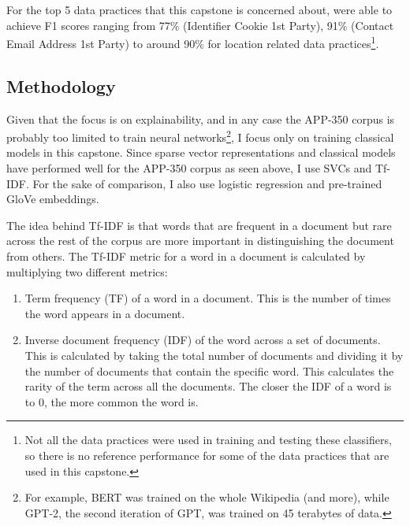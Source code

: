 For the top 5 data practices that this capstone is concerned about, \cite{zimmeck2019} were able to achieve F1 scores ranging from 77\% (Identifier Cookie 1st Party), 91\% (Contact Email Address 1st Party) to around 90\% for location related data practices\footnote{Not all the data practices were used in training and testing these classifiers, so there is no reference performance for some of the data practices that are used in this capstone.}.

\subsection{Methodology}
Given that the focus is on explainability, and in any case the APP-350 corpus is probably too limited to train neural networks\footnote{For example, BERT was trained on the whole Wikipedia (and more), while GPT-2, the second iteration of GPT, was trained on 45 terabytes of data.}, I focus only on training classical models in this capstone. Since sparse vector representations and classical models have performed well for the APP-350 corpus as seen above, I use SVCs and Tf-IDF. For the sake of comparison, I also use logistic regression and pre-trained GloVe embeddings.

The idea behind Tf-IDF is that words that are frequent in a document but rare across the rest of the corpus are more important in distinguishing the document from others. The Tf-IDF metric for a word in a document is calculated by multiplying two different metrics:

\begin{enumerate}
	\item Term frequency (TF) of a word in a document. This is the number of times the word appears in a document.
	\item Inverse document frequency (IDF) of the word across a set of documents. This is calculated by taking the total number of documents and dividing it by the number of documents that contain the specific word. This calculates the rarity of the term across all the documents. The closer the IDF of a word is to 0, the more common the word is.
\end{enumerate}

